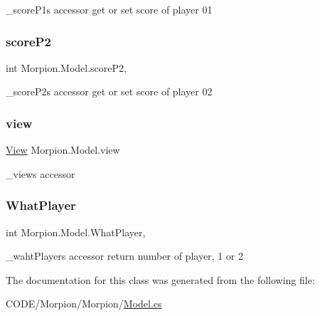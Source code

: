 \+\_\+score\+P1\textquotesingle{}s accessor get or set score of player 01 

\mbox{\label{class_morpion_1_1_model_a66ae61d511963f63b55cc6bb7d19a795}} 
\subsubsection{\texorpdfstring{score\+P2}{scoreP2}}
{\footnotesize\ttfamily int Morpion.\+Model.\+score\+P2\hspace{0.3cm}{\ttfamily [get]}, {\ttfamily [set]}}



\+\_\+score\+P2\textquotesingle{}s accessor get or set score of player 02 

\mbox{\label{class_morpion_1_1_model_a1a6035073f5bde0f41fc053451964eb1}} 
\subsubsection{\texorpdfstring{view}{view}}
{\footnotesize\ttfamily \hyperlink{class_morpion_1_1_view}{View} Morpion.\+Model.\+view\hspace{0.3cm}{\ttfamily [set]}}



\+\_\+view\textquotesingle{}s accessor 

\mbox{\label{class_morpion_1_1_model_a56f84098c9bde669925d9a6850aaf061}} 
\subsubsection{\texorpdfstring{What\+Player}{WhatPlayer}}
{\footnotesize\ttfamily int Morpion.\+Model.\+What\+Player\hspace{0.3cm}{\ttfamily [get]}, {\ttfamily [set]}}



\+\_\+waht\+Player\textquotesingle{}s accessor return number of player, 1 or 2 



The documentation for this class was generated from the following file\+:\begin{DoxyCompactItemize}
\item 
C\+O\+D\+E/\+Morpion/\+Morpion/\hyperlink{_model_8cs}{Model.\+cs}\end{DoxyCompactItemize}

